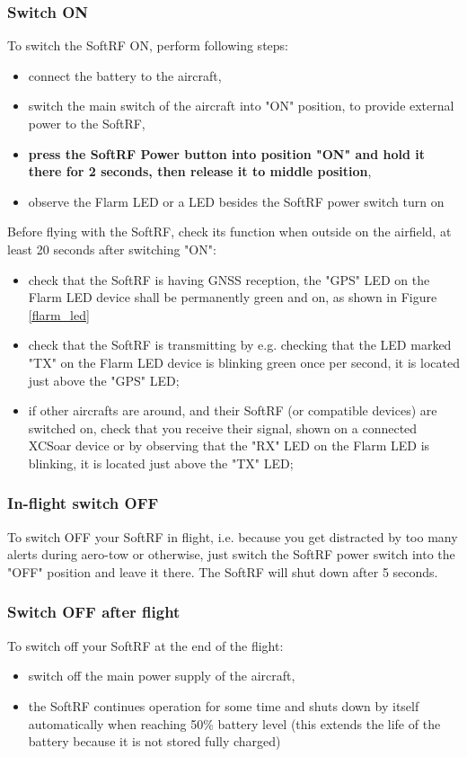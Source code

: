 \documentclass[11pt,a4paper]{article}
\begin{document}
\subsubsection{Switch ON}\label{power_on}
To switch the SoftRF ON, perform following steps:

\begin{itemize}
\item connect the battery to the aircraft, 
\item switch the main switch of the aircraft into "ON" position, to provide external power to the SoftRF,
\item {\bf press the SoftRF Power button into position "ON" and hold it there for 2 seconds, then release it to middle position},
\item observe the Flarm LED or a LED besides the SoftRF power switch turn on
\end{itemize}

Before flying with the SoftRF, check its function when outside on the airfield, at least 20 seconds after switching "ON":
\begin{itemize}
\item check that the SoftRF is having GNSS reception, the "GPS" LED on the Flarm LED device shall be permanently green and on, as shown in Figure \ref{flarm_led}
\item check that the SoftRF is transmitting by e.g. checking that the LED marked "TX" on the Flarm LED device is blinking green once per second, it is located just above the "GPS" LED;
\item if other aircrafts are around, and their SoftRF (or compatible devices) are switched on, check that you receive their signal, shown on a connected XCSoar device or by observing that the "RX" LED on the Flarm LED is blinking, it is located just above the "TX" LED;
\end{itemize}

\subsubsection{In-flight switch OFF}
To switch OFF your SoftRF in flight, i.e. because you get distracted by too many alerts during aero-tow or otherwise, just switch the SoftRF power switch into the "OFF" position and leave it there. The SoftRF will shut down after 5 seconds.

\subsubsection{Switch OFF after flight}
To switch off your SoftRF at the end of the flight:
\begin{itemize}
\item switch off the main power supply of the aircraft,
\item the SoftRF continues operation for some time and shuts down by itself automatically when reaching 50\% battery level (this extends the life of the battery because it is not stored fully charged)
\end{itemize} 
\end{document}
